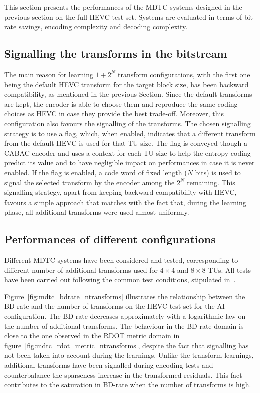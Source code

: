 \documentclass[11pt,a4paper,openright,twoside]{book}
\numberwithin{equation}{section} %
\numberwithin{figure}{section} %
\numberwithin{table}{section} %
\begin{document}
This section presents the performances of the \ac{MDTC} systems designed in
the previous section on the full \ac{HEVC} test set.
Systems are evaluated in terms of bit-rate savings, encoding complexity and
decoding complexity.

\subsection{Signalling the transforms in the bitstream}
\label{sub:mdtc_signalling}

The main reason for learning $1+2^N$ transform configurations, with the first
one being the default \ac{HEVC} transform for the target block size, has been
backward compatibility, as mentioned in the previous Section.
Since the default transforms are kept, the encoder is able to choose them and
reproduce the same coding choices as \ac{HEVC} in case they provide the best
trade-off.
Moreover, this configuration also favours the signalling of the transforms.
The chosen signalling strategy is to use a flag, which, when enabled,
indicates that a different transform from the default \ac{HEVC} is used for
that \ac{TU} size.
The flag is conveyed though a \ac{CABAC} encoder and uses a context for each
\ac{TU} size to help the entropy coding predict its value and to have
negligible impact on performances in case it is never enabled.
If the flag is enabled, a code word of fixed length ($N$ bits) is used to
signal the selected transform by the encoder among the $2^N$ remaining.
This signalling strategy, apart from keeping backward compatibility with
\ac{HEVC}, favours a simple approach that matches with the fact that, during
the learning phase, all additional transforms were used almost uniformly.

\subsection{Performances of different configurations}
\label{sub:mdtc_performances}

Different \ac{MDTC} systems have been considered and tested, corresponding to
different number of additional transforms used for $4\times4$ and $8\times8$
\acp{TU}.
All tests have been carried out following the common test conditions,
stipulated in~\cite{bossen-12-common-test-conditions}.

Figure~\ref{fig:mdtc_bdrate_ntransforms} illustrates the relationship between
the \ac{BD}-rate and the number of transforms on the \ac{HEVC} test set for
the \ac{AI} configuration.
The \ac{BD}-rate decreases approximately with a logarithmic law on the number
of additional transforms.
The behaviour in the \ac{BD}-rate domain is close to the one observed in the
\ac{RDOT} metric domain in figure~\ref{fig:mdtc_rdot_metric_ntransforms},
despite the fact that signalling has not been taken into account during the
learnings.
Unlike the transform learnings, additional transforms have been signalled
during encoding tests and counterbalance the sparseness increase in the
transformed residuals.
This fact contributes to the saturation in \ac{BD}-rate when the number of
transforms is high.
\end{document}
